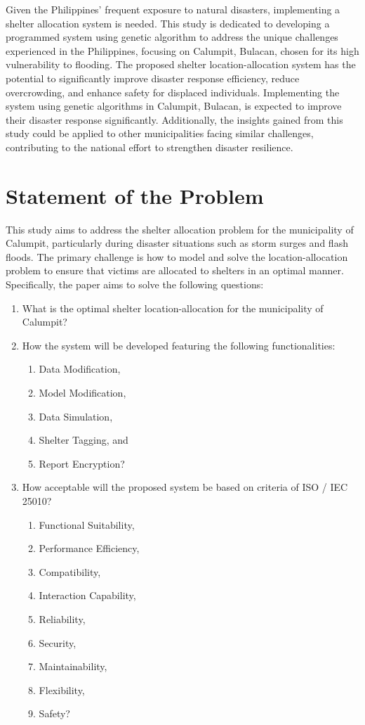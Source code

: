 	Given the Philippines' frequent exposure to natural disasters, implementing a shelter allocation system is needed. This study is dedicated to developing a programmed system using genetic algorithm to address the unique challenges experienced in the Philippines, focusing on Calumpit, Bulacan, chosen for its high vulnerability to flooding. The proposed shelter location-allocation system has the potential to significantly improve disaster response efficiency, reduce overcrowding, and enhance safety for displaced individuals. Implementing the system using genetic algorithms in Calumpit, Bulacan, is expected to improve their disaster response significantly. Additionally, the insights gained from this study could be applied to other municipalities facing similar challenges, contributing to the national effort to strengthen disaster resilience. 

\section{Statement of the Problem}
	This study aims to address the shelter allocation problem for the municipality of Calumpit, particularly during disaster situations such as storm surges and flash floods. The primary challenge is how to model and solve the location-allocation problem to ensure that victims are allocated to shelters in an optimal manner. Specifically, the paper aims to solve the following questions:
	
	\begin{enumerate}
		\item What is the optimal shelter location-allocation for the municipality of Calumpit?
		\item How the system will be developed featuring the following functionalities:
		\begin{enumerate}
			\item Data Modification,
			\item Model Modification,
			\item Data Simulation,
			\item Shelter Tagging, and
			\item Report Encryption?
		\end{enumerate}
		\item How acceptable will the proposed system be based on criteria of ISO / IEC 25010?
		\begin{enumerate}
			\item Functional Suitability,
			\item Performance Efficiency,
			\item Compatibility,
			\item Interaction Capability,
			\item Reliability,
			\item Security,
			\item Maintainability,
			\item Flexibility,
			\item Safety?
		\end{enumerate}
	\end{enumerate}
	
